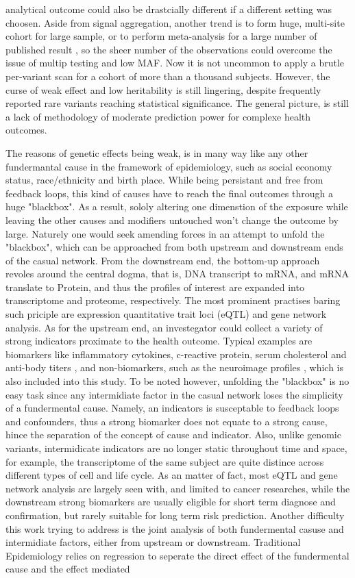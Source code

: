 analytical outcome could also be drastcially different if a different setting was choosen. Aside from signal aggregation, another trend is to form huge, multi-site cohort for large sample, or to perform meta-analysis for a large number of published result \cite{META1}, so the sheer number of the observations could overcome the issue of multip testing and low MAF. Now it is not uncommon to apply a brutle per-variant scan for a cohort of more than a thousand subjects. However, the curse of weak effect and low heritability is still lingering, despite frequently reported rare variants reaching statistical significance. The general picture, is still a lack of methodology of moderate prediction power for complexe health outcomes.

The reasons of genetic effects being weak, is in many way like any other fundermantal cause in the framework of epidemiology, such as social economy status, race/ethnicity and birth place. While being persistant and free from feedback loops, this kind of causes have to reach the final outcomes through a huge "blackbox". As a result, sololy altering one dimenstion of the exposure while leaving the other causes and modifiers untouched won't change the outcome by large. Naturely one would seek amending forces in an attempt to unfold the "blackbox", which can be approached from both upstream and downstream ends of the casual network. From the downstream end, the bottom-up approach revoles around the central dogma, that is, DNA transcript to mRNA, and mRNA translate to Protein, and thus the profiles of interest are expanded into transcriptome and proteome, respectively. The most prominent practises baring such priciple are expression quantitative trait loci (eQTL)\cite{eQTL1, eQTL2} and gene network analysis. As for the upstream end, an investegator could collect a variety of strong indicators proximate to the health outcome. Typical examples are biomarkers like inflammatory cytokines, c-reactive protein, serum cholesterol and anti-body titers \cite{cytokine1, CRP1}, and non-biomarkers, such as the neuroimage profiles \cite{VWA1, VWA2, VWA3, VWA4}, which is also included into this study. To be noted however, unfolding the "blackbox" is no easy task since any intermidiate factor in the casual network loses the simplicity of a fundermental cause. Namely, an indicators is susceptable to feedback loops and confounders, thus a strong biomarker does not equate to a strong cause, hince the separation of the concept of cause and indicator. Also, unlike genomic variants, intermidicate indicators are no longer static throughout time and space, for example, the transcriptome of the same subject are quite distince across different types of cell and life cycle. As an matter of fact, most eQTL and gene network analysis are largely seen with, and limited to cancer researches, while the downstream strong biomarkers are usually eligible for short term diagnose and confirmation, but rarely suitable for long term risk prediction. Another difficulty this work trying to address is the joint analysis of both fundermental casuse and intermidiate factors, either from upstream or downstream. Traditional Epidemiology relies on regression to seperate the direct effect of the fundermental cause and the effect mediated 